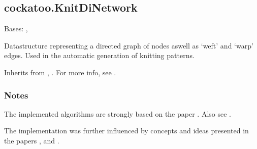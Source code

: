 \documentclass[letterpaper,10pt,english]{sphinxmanual}
\begin{document}
\begin{fulllineitems}
\begin{fulllineitems}
\begin{description}
\end{description}

\end{fulllineitems}


\end{fulllineitems}



\subsection{cockatoo.KnitDiNetwork}
\label{\detokenize{cockatoo:cockatoo-knitdinetwork}}

\begin{fulllineitems}
\label{\detokenize{cockatoo:cockatoo.KnitDiNetwork}}
Bases: , 

Datastructure representing a directed graph of nodes aswell as ‘weft’
and ‘warp’ edges. Used in the automatic generation of knitting patterns.

Inherits from , {\hyperref[\detokenize{cockatoo:cockatoo.KnitNetworkBase}]{}}.
For more info, see  \sphinxfootnotemark[13].
\subsubsection*{Notes}

The implemented algorithms are strongly based on the paper
 \sphinxfootnotemark[1].
Also see  \sphinxfootnotemark[2].

The implementation was further influenced by concepts and ideas presented
in the papers  \sphinxfootnotemark[3],
 \sphinxfootnotemark[4] and
 \sphinxfootnotemark[5].


\end{fulllineitems}
\end{document}
